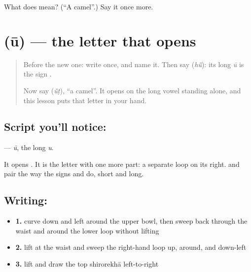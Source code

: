 \begin{tcolorbox}[breakable,colback=teal!4,colframe=teal!35!black,title={Before you move on}]
What does \textbf{} mean? (\textquotedblleft{}A camel\textquotedblright{}.) Say it once more.
\end{tcolorbox}
\section[\texorpdfstring{\mw{ऊ} (ū)}{ऊ (ū)}]{ (ū) — the letter that opens }

\label{lesson:MW-W45-uu}



\begin{quote}
Before the new one: write \textbf{} once, and name it. Then say \textbf{} (\emph{hū̃}): its long \emph{ū} is the sign \textbf{}.

Now say \textbf{} (\emph{ū̃ṭ}), \textquotedblleft{}a camel\textquotedblright{}. It opens on the long vowel standing alone, and this lesson puts that letter in your hand.
\end{quote}

\subsection*{Script you'll notice: }
\textbf{} — \emph{ū}, the long \emph{u}.

It opens \textbf{}. It is the letter \textbf{} with one more part: a separate loop on its right. \textbf{} and \textbf{} pair the way the signs \textbf{} and \textbf{} do, short and long.

\subsection*{Writing: }

\begin{itemize}
\raggedright
  \item \textbf{1.} curve down and left around the upper bowl, then sweep back through the waist and around the lower loop without lifting
  \item \textbf{2.} lift at the waist and sweep the right-hand loop up, around, and down-left
  \item \textbf{3.} lift and draw the top shirorekhā left-to-right
\end{itemize}

